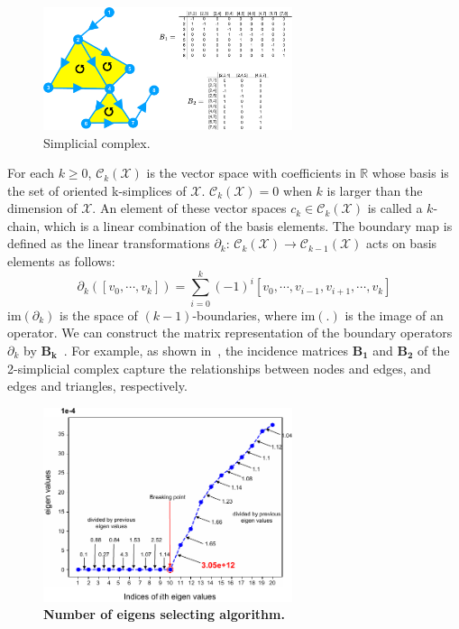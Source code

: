 \begin{figure}[!h]
    \centering
    \includegraphics[width=0.65\textwidth]{Simplicial_Complex/fig}
    \vspace{0.1cm}
    \caption[Simplicial complex.]{Simplicial complex.}
    \label{fig:sc}
\end{figure}


For each $k \geq 0$, $\mathcal{C}_k(\mathcal{X})$ is the vector space with coefficients in $\mathbb{R}$ whose basis is the set of oriented k-simplices of $\mathcal{X}$. $\mathcal{C}_k(\mathcal{X}) = 0$ when $k$ is larger than the dimension of $\mathcal{X}$. An element of these vector spaces $c_k \in \mathcal{C}_k(\mathcal{X})$ is called a $k$-chain, which is a linear combination of the basis elements. The boundary map is defined as the linear transformations $\partial_{k}$: $\mathcal{C}_k(\mathcal{X}) \rightarrow \mathcal{C}_{k-1}(\mathcal{X})$ acts on basis elements as follows:
\begin{equation}
\partial_k ([v_0,\cdots, v_k]) = \sum_{i=0}^{k} (-1)^i [v_0, \cdots, v_{i-1}, v_{i+1}, \cdots, v_k]
\end{equation}
$\mathrm{im}(\partial_k)$ is the space of $(k-1)$-boundaries, where $\mathrm{im}(.)$ is the image of an operator. We can construct the matrix representation of the boundary operators $\partial_k$ by $\mathbf{B_k}$~\citep{lim2020hodge,muhammad2006control}. For example, as shown in~, the incidence matrices $\mathbf{B_1}$ and $\mathbf{B_2}$ of the 2-simplicial complex capture the relationships between nodes and edges, and edges and triangles, respectively.

\begin{figure}[!ht]
	\centering
	\includegraphics[width=0.65\textwidth]{breakingpoint/fig}
	\vspace{0.1cm}
	\caption[Number of eigens selecting algorithm.]{\textbf{Number of eigens selecting algorithm.}}
	\label{fig:breakingpoint}
\end{figure}


